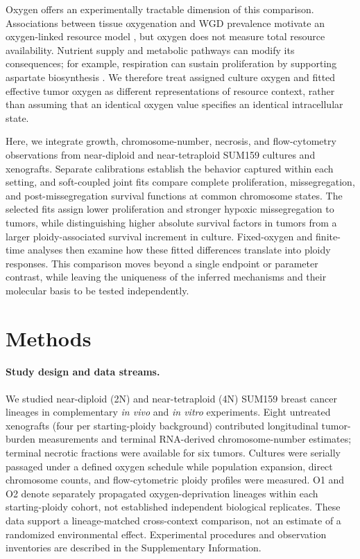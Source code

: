 \documentclass[11pt]{article}
\let\cite\supercite
\begin{document}
Oxygen offers an experimentally tractable dimension of this comparison. Associations between tissue oxygenation and WGD prevalence motivate an oxygen-linked resource model \cite{donovan_hyperdiploid_2014,beck_energetics_2025}, but oxygen does not measure total resource availability. Nutrient supply and metabolic pathways can modify its consequences; for example, respiration can sustain proliferation by supporting aspartate biosynthesis \cite{sullivan_supporting_2015}. We therefore treat assigned culture oxygen and fitted effective tumor oxygen as different representations of resource context, rather than assuming that an identical oxygen value specifies an identical intracellular state.

Here, we integrate growth, chromosome-number, necrosis, and flow-cytometry observations from near-diploid and near-tetraploid SUM159 cultures and xenografts. Separate calibrations establish the behavior captured within each setting, and soft-coupled joint fits compare complete proliferation, missegregation, and post-missegregation survival functions at common chromosome states. The selected fits assign lower proliferation and stronger hypoxic missegregation to tumors, while distinguishing higher absolute survival factors in tumors from a larger ploidy-associated survival increment in culture. Fixed-oxygen and finite-time analyses then examine how these fitted differences translate into ploidy responses. This comparison moves beyond a single endpoint or parameter contrast, while leaving the uniqueness of the inferred mechanisms and their molecular basis to be tested independently.

\section*{Methods}

\paragraph{Study design and data streams.}
We studied near-diploid (2N) and near-tetraploid (4N) SUM159 breast cancer lineages in complementary \textit{in vivo} and \textit{in vitro} experiments. Eight untreated xenografts (four per starting-ploidy background) contributed longitudinal tumor-burden measurements and terminal RNA-derived chromosome-number estimates; terminal necrotic fractions were available for six tumors. Cultures were serially passaged under a defined oxygen schedule while population expansion, direct chromosome counts, and flow-cytometric ploidy profiles were measured. O1 and O2 denote separately propagated oxygen-deprivation lineages within each starting-ploidy cohort, not established independent biological replicates. These data support a lineage-matched cross-context comparison, not an estimate of a randomized environmental effect. Experimental procedures and observation inventories are described in the Supplementary Information.
\end{document}
